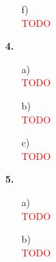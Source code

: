\documentclass[a4paper,11pt,fleqn]{scrartcl}
\begin{document}
\begin{enumerate}
\begin{enumerate}
			\item[f)]\quad \\
				\textcolor{red}{TODO}
		\end{enumerate}
		\item[\textbf{4.}]
		\begin{enumerate}
			\item[a)]\quad \\
				\textcolor{red}{TODO}
			\item[b)]\quad \\
				\textcolor{red}{TODO}
			\item[c)]\quad \\
				\textcolor{red}{TODO}
		\end{enumerate}
		\item[\textbf{5.}]
		\begin{enumerate}
			\item[a)]\quad \\
				\textcolor{red}{TODO}
			\item[b)]\quad \\
				\textcolor{red}{TODO}
		\end{enumerate}
	\end{enumerate}
\end{document}
